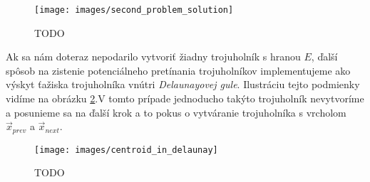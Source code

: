 \begin{figure}
    \centerline{\texttt{[image: images/second\_problem\_solution]}}
    \caption[TODO]{TODO}
    \label{obr:second_problem_solution}
\end{figure}

Ak sa nám doteraz nepodarilo vytvoriť žiadny trojuholník s hranou $E$, ďalší spôsob na 
zistenie potenciálneho pretínania trojuholníkov implementujeme ako 
výskyt ťažiska trojuholníka vnútri \textit{Delaunayovej gule}. Ilustráciu tejto podmienky
vidíme na obrázku \ref{obr:centroid_in_delaunay}.V tomto prípade jednoducho
takýto trojuholník nevytvoríme a posunieme sa na ďalší krok a to pokus o vytváranie trojuholníka
s vrcholom $\overrightarrow{x}_{prev}$ a $\overrightarrow{x}_{next}$. 

\begin{figure}
    \centerline{\texttt{[image: images/centroid\_in\_delaunay]}}
    \caption[TODO]{TODO}
    \label{obr:centroid_in_delaunay}
\end{figure}

